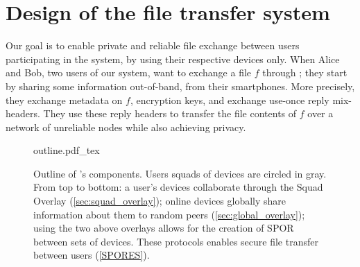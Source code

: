 \section{Design of the \name file transfer system}%
\label{design}

Our goal is to enable private and reliable file exchange between users 
participating in the system, by using their respective devices only.
When Alice and Bob, two users of our system, want to exchange a file \(f\) 
through \name; they start by sharing some information out-of-band, \eg from 
their smartphones.
More precisely, they exchange metadata on \(f\), encryption keys, and exchange 
use-once reply mix-headers.
They use these reply headers to transfer the file contents of \(f\) over a 
network of unreliable nodes while also achieving privacy.

\begin{figure}[t]
  \centering
  \def\svgwidth{0.8\columnwidth}
  {outline.pdf_tex}
  \caption{\label{fig:outline}%
    Outline of \name's components. Users squads of devices are circled in gray. 
    From top to bottom: a user's devices collaborate through the Squad Overlay 
    (\cref{sec:squad_overlay}); online devices globally share information about 
    them to random peers (\cref{sec:global_overlay}); using the two above 
    overlays allows for the creation of \ac{SPOR} between sets of devices. 
    These protocols enables secure file transfer between users 
    (\cref{SPORES}).}
\end{figure}

